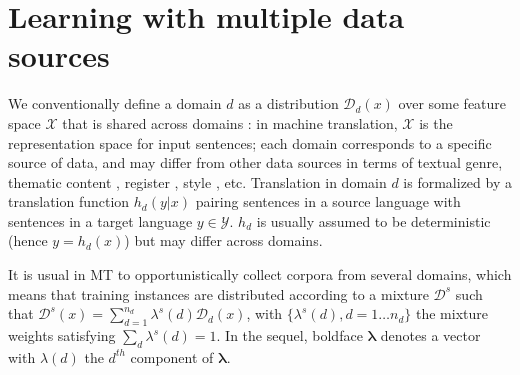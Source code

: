 \documentclass[11pt]{article}
\newcommand{\vlambda}{\ensuremath{\boldsymbol\lambda}\xspace} %
\begin{document}
\section{Learning with multiple data sources} \label{sec:mdmt}

We conventionally define a domain $d$ as a distribution $\mathcal{D}_d(x)$ over some feature space $\mathcal{X}$ that is shared across domains \cite{Pan10asurvey}: in machine translation, $\mathcal{X}$ is the representation space for input sentences; each domain corresponds to a specific source of data, and may differ from other data sources in terms of textual genre, thematic content \cite{Chen16guided,Zhang16topicinformed}, register \cite{Sennrich16politeness}, style \cite{Niu18multitask}, etc. Translation in domain $d$ is formalized by a translation function $h_d(y|x)$ pairing sentences in a source language with sentences in a target language $y \in \mathcal{Y}$. $h_d$ is usually assumed to be deterministic (hence $y = h_d(x)$) but may differ across domains.

It is usual in MT to opportunistically collect corpora from several domains, which means that training instances are distributed according to a mixture $\mathcal{D}^s$ such that $\mathcal{D}^s(x) = \sum_{d=1}^{n_d} \lambda^{s}(d) \mathcal{D}_d(x)$, with $\{\lambda^{s}(d), d=1 \dots n_d\}$ the mixture weights satisfying $\sum_d \lambda^{s}(d)=1$. In the sequel, boldface $\vlambda$ denotes a vector with $\lambda(d)$ the $d^{th}$ component of $\vlambda$.
\end{document}
